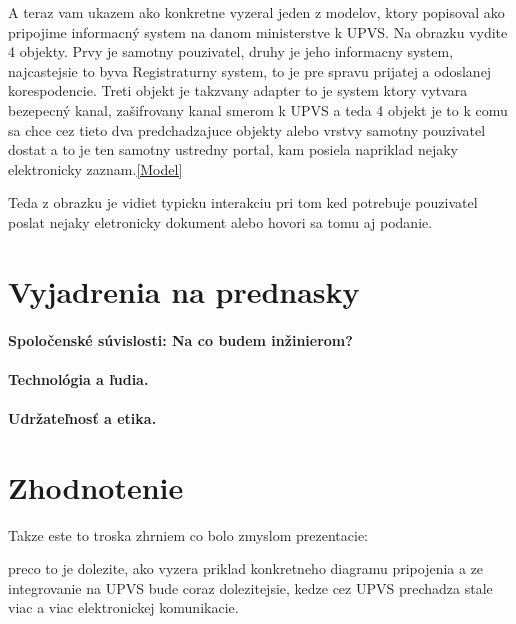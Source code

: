 \documentclass[10pt,twoside,slovak,a4paper]{article}
\begin{document}
A teraz vam ukazem ako konkretne vyzeral jeden z modelov, ktory popisoval ako pripojime informacný system na danom ministerstve k UPVS. Na obrazku vydite 4 objekty. Prvy je samotny pouzivatel, druhy je jeho informacny system, najcastejsie to byva Registraturny system, to je pre spravu prijatej a odoslanej korespodencie. Treti objekt je takzvany adapter to je system ktory vytvara bezepecný kanal, zašifrovany kanal smerom k UPVS a teda 4 objekt je to k comu sa chce cez tieto dva predchadzajuce objekty alebo vrstvy samotny pouzivatel dostat a to je ten samotny ustredny portal, kam posiela napriklad nejaky elektronicky zaznam.\ref{Model}

Teda z obrazku je vidiet typicku interakciu pri tom ked potrebuje pouzivatel poslat nejaky eletronicky dokument alebo hovori sa tomu aj podanie.\newline




\section{Vyjadrenia na prednasky} \label{5sek}


\paragraph{Spoločenské súvislosti: Na co budem inžinierom? }

\paragraph{Technológia a ľudia.}

\paragraph{Udržateľnosť a etika.}


\section{Zhodnotenie} \label{6sek} 
Takze este to troska zhrniem co bolo zmyslom prezentacie:
 
preco to je dolezite, ako vyzera priklad konkretneho diagramu pripojenia a ze integrovanie na UPVS bude coraz dolezitejsie, kedze cez UPVS prechadza stale viac a viac elektronickej komunikacie. \\






 
\end{document}
